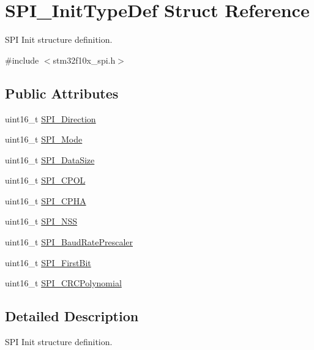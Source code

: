 \hypertarget{struct_s_p_i___init_type_def}{}\section{S\+P\+I\+\_\+\+Init\+Type\+Def Struct Reference}
\label{struct_s_p_i___init_type_def}


S\+PI Init structure definition.  




{\ttfamily \#include $<$stm32f10x\+\_\+spi.\+h$>$}

\subsection*{Public Attributes}
\begin{DoxyCompactItemize}
\item 
uint16\+\_\+t \hyperlink{struct_s_p_i___init_type_def_a8cf0fefa76b9238a41997db14eac62a9}{S\+P\+I\+\_\+\+Direction}
\item 
uint16\+\_\+t \hyperlink{struct_s_p_i___init_type_def_a578435d3b3a17baa5d5ff87447aa697f}{S\+P\+I\+\_\+\+Mode}
\item 
uint16\+\_\+t \hyperlink{struct_s_p_i___init_type_def_a0e63950d46a6483f9b7048b8c97800b8}{S\+P\+I\+\_\+\+Data\+Size}
\item 
uint16\+\_\+t \hyperlink{struct_s_p_i___init_type_def_a1fe46794d91fd950e06da06b0e488997}{S\+P\+I\+\_\+\+C\+P\+OL}
\item 
uint16\+\_\+t \hyperlink{struct_s_p_i___init_type_def_acdaac9259c45f137e804f90122edb129}{S\+P\+I\+\_\+\+C\+P\+HA}
\item 
uint16\+\_\+t \hyperlink{struct_s_p_i___init_type_def_a6c1ea4b5e3d147b74799efa42e3903c6}{S\+P\+I\+\_\+\+N\+SS}
\item 
uint16\+\_\+t \hyperlink{struct_s_p_i___init_type_def_adfcf6178b6a117643111c13403f32e71}{S\+P\+I\+\_\+\+Baud\+Rate\+Prescaler}
\item 
uint16\+\_\+t \hyperlink{struct_s_p_i___init_type_def_ace7ca292c290953f8a6ae86f79949f5b}{S\+P\+I\+\_\+\+First\+Bit}
\item 
uint16\+\_\+t \hyperlink{struct_s_p_i___init_type_def_aee6460416ade6c4016aac2bd64cae0eb}{S\+P\+I\+\_\+\+C\+R\+C\+Polynomial}
\end{DoxyCompactItemize}


\subsection{Detailed Description}
S\+PI Init structure definition. 

